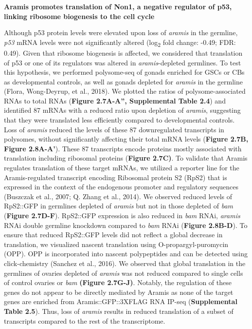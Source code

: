 \documentclass[12pt,oneside]{reedthesis}
\begin{document}
\textbf{Aramis promotes translation of Non1, a negative regulator of p53,
linking ribosome biogenesis to the cell cycle}

Although p53 protein levels were elevated upon loss of \emph{aramis} in the
germline, \emph{p53} mRNA levels were not significantly altered (log\textsubscript{2} fold
change: -0.49; FDR: 0.49). Given that ribosome biogenesis is affected,
we considered that translation of p53 or one of its regulators was
altered in \emph{aramis}-depleted germlines. To test this hypothesis, we
performed polysome-seq of gonads enriched for GSCs or CBs as
developmental controls, as well as gonads depleted for \emph{aramis} in the
germline (Flora, Wong-Deyrup, et al., 2018). We plotted the ratios of polysome-associated
RNAs to total RNAs (\textbf{Figure 2.7A-A'', Supplemental Table 2.4}) and
identified 87 mRNAs with a reduced ratio upon depletion of \emph{aramis},
suggesting that they were translated less efficiently compared to
developmental controls. Loss of \emph{aramis} reduced the levels of these 87
downregulated transcripts in polysomes, without significantly affecting
their total mRNA levels (\textbf{Figure 2.7B, Figure 2.8A-A'}). These 87
transcripts encode proteins mostly associated with translation including
ribosomal proteins (\textbf{Figure 2.7C)}. To validate that Aramis regulates
translation of these target mRNAs, we utilized a reporter line for the
Aramis-regulated transcript encoding Ribosomal protein S2 (RpS2) that is
expressed in the context of the endogenous promoter and regulatory
sequences (Buszczak et al., 2007; Q. Zhang et al., 2014). We
observed reduced levels of RpS2::GFP in germlines depleted of \emph{aramis}
but not in those depleted of \emph{bam} (\textbf{Figure 2.7D-F}). RpS2::GFP
expression is also reduced in \emph{bam} RNAi, \emph{aramis} RNAi double germline
knockdown compared to \emph{bam} RNAi (\textbf{Figure 2.8B-D}). To ensure that
reduced RpS2::GFP levels did not reflect a global decrease in
translation, we visualized nascent translation using
O-propargyl-puromycin (OPP). OPP is incorporated into nascent
polypeptides and can be detected using click-chemistry
(Sanchez et al., 2016). We observed that global translation in the germlines
of ovaries depleted of \emph{aramis} was not reduced compared to single cells
of control ovaries or \emph{bam} \textbf{(Figure 2.7G-J)}. Notably, the regulation
of these genes do not appear to be directly mediated by Aramis as none
of the target genes are enriched from Aramis::GFP::3XFLAG RNA IP-seq
(\textbf{Supplemental Table 2.5}). Thus, loss of \emph{aramis} results in reduced
translation of a subset of transcripts compared to the rest of the
transcriptome.
\end{document}
